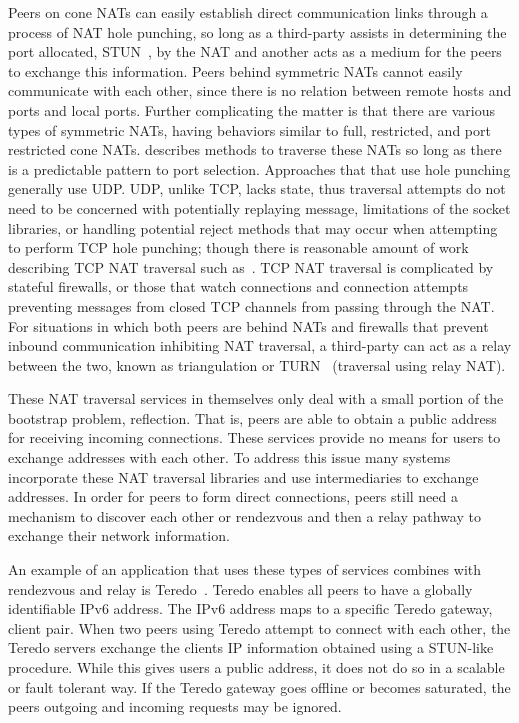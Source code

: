 \documentclass[conference]{IEEEtran}
\begin{document}
Peers on cone NATs can easily establish direct communication links through a
process of NAT hole punching, so long as a third-party assists in determining
the port allocated, STUN~\cite{stun_rfc}, by the NAT and another acts as a
medium for the peers to exchange this information.  Peers behind symmetric NATs
cannot easily communicate with each other, since there is no relation between
remote hosts and ports and local ports.  Further complicating the matter is
that there are various types of symmetric NATs, having behaviors similar to
full, restricted, and port restricted cone NATs.  \cite{ice} describes methods
to traverse these NATs so long as there is a predictable pattern to port
selection.  Approaches that that use hole punching generally use UDP.  UDP,
unlike TCP, lacks state, thus traversal attempts do not need to be concerned
with potentially replaying message, limitations of the socket libraries, or
handling potential reject methods that may occur when attempting to perform TCP
hole punching;  though there is reasonable amount of work describing TCP NAT
traversal such as~\cite{tcp_nat}.  TCP NAT traversal is complicated by stateful
firewalls, or those that watch connections and connection attempts preventing
messages from closed TCP channels from passing through the NAT.  For situations
in which both peers are behind NATs and firewalls that prevent inbound
communication inhibiting NAT traversal, a third-party can act as a relay
between the two, known as triangulation or TURN~\cite{turn} (traversal using
relay NAT).

These NAT traversal services in themselves only deal with a small portion of
the bootstrap problem, reflection.  That is, peers are able to obtain a public
address for receiving incoming connections.  These services provide no means
for users to exchange addresses with each other.  To address this issue many
systems incorporate these NAT traversal libraries and use intermediaries to
exchange addresses.  In order for peers to form direct connections, peers still
need a mechanism to discover each other or rendezvous and then a relay pathway
to exchange their network information.

An example of an application that uses these types of services combines with
rendezvous and relay is Teredo~\cite{teredo}.  Teredo enables all peers to have
a globally identifiable IPv6 address.  The IPv6 address maps to a specific
Teredo gateway, client pair.  When two peers using Teredo attempt to connect
with each other, the Teredo servers exchange the clients IP information
obtained using a STUN-like procedure.  While this gives users a public address,
it does not do so in a scalable or fault tolerant way.  If the Teredo gateway
goes offline or becomes saturated, the peers outgoing and incoming requests may
be ignored.
\end{document}
